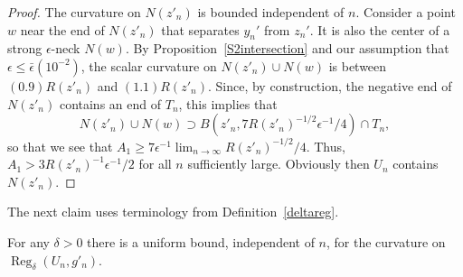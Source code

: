 \begin{proof}
\sketch
The curvature on  $N(z'_n)$ is bounded independent of $n$. Consider
a point $w$ near the end of $N(z'_n)$ that separates $y_n'$ from
$z_n'$. It is also the center of a strong $\epsilon$-neck $N(w)$. By
Proposition~\ref{S2intersection} and our assumption that
$\epsilon\le \bar\epsilon(10^{-2})$, the scalar curvature on
$N(z'_n)\cup N(w)$ is between $(0.9)R(z'_n)$ and $(1.1)R(z'_n)$.
Since, by construction, the negative end of $N(z'_n)$ contains an
end of $T_n$, this implies that
$$N(z'_n)\cup N(w)\supset B(z'_n,7R(z'_n)^{-1/2}\epsilon^{-1}/4)\cap T_n,$$
 so that we see that
$A_1\ge 7\epsilon^{-1}\lim_{n\rightarrow\infty}
R(z'_n)^{-1/2}/4$. Thus, $A_1>3R(z'_n)^{-1}\epsilon^{-1}/2$ for all
$n$ sufficiently large. Obviously then $U_n$ contains $N(z'_n)$.
\end{proof}

The next claim uses terminology from Definition~\ref{deltareg}.

\begin{claim}
\label{claim:uniform-curvature-bound-reg-delta}
For any $\delta>0$ there is a uniform bound, independent of $n$, for
the curvature on $\operatorname{Reg}_\delta(U_n,g'_n)$.
\end{claim}

